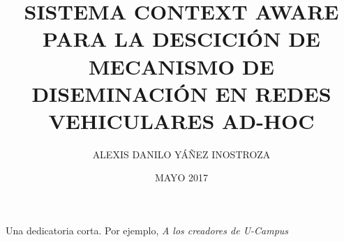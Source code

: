 \documentclass[upright, contnum]{umemoria}
\author{ALEXIS DANILO YÁÑEZ INOSTROZA}
\title{SISTEMA CONTEXT AWARE PARA LA DESCICIÓN DE MECANISMO DE DISEMINACIÓN EN REDES VEHICULARES AD-HOC}
\date{MAYO 2017}
\begin{document}
\frontmatter
\maketitle

\begin{abstract}
{\lipsum[1-4]}
\end{abstract}

\begin{dedicatoria} %
Una dedicatoria corta. Por ejemplo, \emph{A los creadores de U-Campus}
\end{dedicatoria}

\begin{thanks} %
\lipsum[1-2]
\end{thanks}
\cleardoublepage

\tableofcontents
\listoftables %
\listoffigures %

\mainmatter






\nocite{*}



\end{document}
